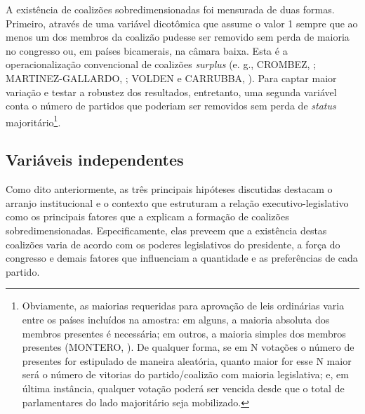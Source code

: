 A existência de coalizões sobredimensionadas foi mensurada de duas formas. Primeiro, através de uma variável dicotômica que assume o valor 1 sempre que ao menos um dos membros da coalizão pudesse ser removido sem perda de maioria no congresso ou, em países bicamerais, na câmara baixa. Esta é a operacionalização convencional de coalizões \textit{surplus} (e. g., CROMBEZ, \citeyear{crombez1996}; MARTINEZ-GALLARDO, \citeyear{martinez2012}; VOLDEN e CARRUBBA, \citeyear{volden2004}). Para captar maior variação e testar a robustez dos resultados, entretanto, uma segunda variável conta o número de partidos que poderiam ser removidos sem perda de \textit{status} majoritário\footnote{Obviamente, as maiorias requeridas para aprovação de leis ordinárias varia entre os países incluídos na amostra: em alguns, a maioria absoluta dos membros presentes é necessária; em outros, a maioria simples dos membros presentes (MONTERO, \citeyear{montero2013}). De qualquer forma, se em N votações o número de presentes for estipulado de maneira aleatória, quanto maior for esse N maior será o número de vitorias do partido/coalizão com maioria legislativa; e, em última instância, qualquer votação poderá ser vencida desde que o total de parlamentares do lado majoritário seja mobilizado.}.

\subsection{Variáveis independentes}

Como dito anteriormente, as três principais hipóteses discutidas destacam o arranjo institucional e o contexto que estruturam a relação executivo-legislativo como os principais fatores que a explicam a formação de coalizões sobredimensionadas. Especificamente, elas preveem que a existência destas coalizões varia de acordo com os poderes legislativos do presidente, a força do congresso e demais fatores que influenciam a quantidade e as preferências de cada partido.

